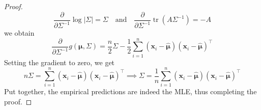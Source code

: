 \begin{proof}
    \[
    \frac{\partial}{\partial \Sigma^{-1}} \log |\Sigma| = \Sigma
    \quad \text{and} \quad
    \frac{\partial}{\partial \Sigma^{-1}} \operatorname{tr}(A\Sigma^{-1}) = -A
    \]
    we obtain
    \[
    \frac{\partial}{\partial \Sigma^{-1}} g(\boldsymbol{\mu},\Sigma) = \frac{n}{2}\Sigma - \frac{1}{2}\sum_{i=1}^n (\mathbf{x}_i - \hat{\boldsymbol{\mu}})(\mathbf{x}_i - \hat{\boldsymbol{\mu}})^\top
    \]
    Setting the gradient to zero, we get
    \[
    n\Sigma = \sum_{i=1}^n (\mathbf{x}_i - \hat{\boldsymbol{\mu}})(\mathbf{x}_i - \hat{\boldsymbol{\mu}})^\top
    \implies
    \Sigma = \frac{1}{n} \sum_{i=1}^n (\mathbf{x}_i - \hat{\boldsymbol{\mu}})(\mathbf{x}_i - \hat{\boldsymbol{\mu}})^\top
    \]
    Put together, the empirical predictions are indeed the MLE, thus completing the proof.
\end{proof}